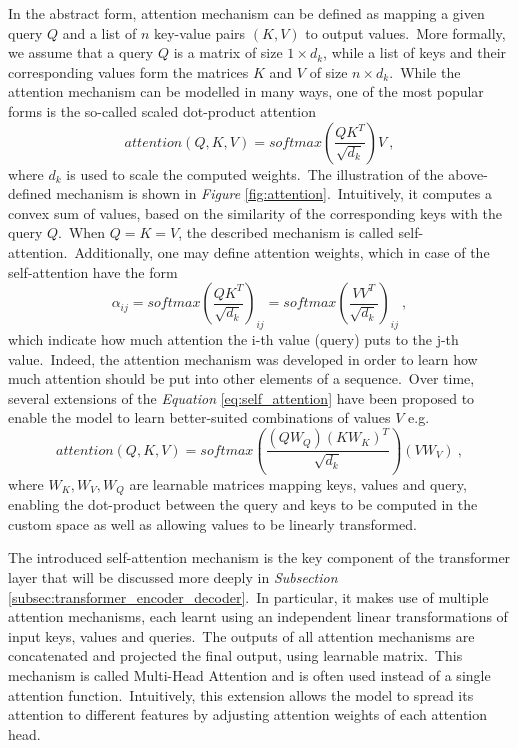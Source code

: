\documentclass[longabstract, english, mgr]{iithesis}
\theoremstyle{default_theorem_style}\newtheorem{theorem}{Theorem}
\theoremstyle{default_theorem_style}\newtheorem{definition}{Definition}
\begin{document}
In the abstract form, attention mechanism can be defined as mapping a given query $Q$ and a list of $n$ key-value pairs
$(K, V)$ to output values.\ More formally, we assume that a query $Q$ is a matrix of size $1 \times d_k$, while
a list of keys and their corresponding values form the matrices $K$ and $V$ of size $n \times d_k$.\ While
the attention mechanism can be modelled in many ways, one of the most popular forms is the so-called scaled
dot-product attention
\begin{equation}\label{eq:self_attention}
attention(Q, K, V) = softmax(\frac{Q K^T}{\sqrt{d_k}}) V\ ,
\end{equation}
where $d_k$ is used to scale the computed weights.\ The illustration of the above-defined mechanism is shown in
\textit{Figure} \ref{fig:attention}.\ Intuitively, it computes a convex sum of values, based on the similarity of
the corresponding keys with the query $Q$.\ When $Q = K = V$, the described mechanism is called
self-attention.\ Additionally, one may define attention weights, which in case of the self-attention have the form
$$
\alpha_{ij} = softmax(\frac{Q K^T}{\sqrt{d_k}})_{ij} = softmax(\frac{V V^T}{\sqrt{d_k}})_{ij}\ ,
$$
which indicate how much attention the i-th value (query) puts to the j-th value.\ Indeed, the attention mechanism
was developed in order to learn how much attention should be put into other elements of a sequence.\ Over
time, several extensions of the \textit{Equation} \ref{eq:self_attention} have been proposed to enable the model to
learn better-suited combinations of values $V$ e.g.\
$$
attention(Q, K, V) = softmax(\frac{(Q W_Q) (K W_K)^T}{\sqrt{d_k}}) (V W_V)\ ,
$$
where $W_K, W_V, W_Q$ are learnable matrices mapping keys, values and query, enabling the dot-product between the
query and keys to be computed in the custom space as well as allowing values to be linearly transformed.\newline

\noindent The introduced self-attention mechanism is the key component of the transformer layer that will be discussed
more deeply in \textit{Subsection} \ref{subsec:transformer_encoder_decoder}.\ In particular, it makes use of
multiple attention mechanisms, each learnt using an independent linear transformations
of input keys, values and queries.\ The outputs of all attention mechanisms are concatenated and projected the
final output, using learnable matrix.\ This mechanism is called Multi-Head Attention and is often used instead
of a single attention function.\ Intuitively, this extension allows the model to spread its
attention to different features by adjusting attention weights of each attention head.
\end{document}
